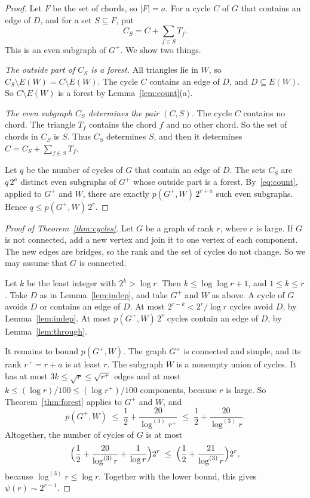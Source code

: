 \documentclass[11pt]{article}
\theoremstyle{definition}
\theoremstyle{remark}
\newcommand{\lgk}[1]{\log^{(#1)}}
\newcommand{\sm}{\setminus}
\numberwithin{equation}{section}
\begin{document}
\begin{proof}
Let $F$ be the set of chords, so $|F|=a$. For a cycle $C$ of $G$ that contains an edge of $D$, and
for a set $S\subseteq F$, put
\[
  C_S=C+\sum_{f\in S}T_f .
\]
This is an even subgraph of $G^{+}$. We show two things.

\emph{The outside part of $C_S$ is a forest.} All triangles lie in $W$, so
$C_S\sm E(W)=C\sm E(W)$. The cycle $C$ contains an edge of $D$, and $D\subseteq E(W)$. So
$C\sm E(W)$ is a forest by Lemma~\ref{lem:count}(a).

\emph{The even subgraph $C_S$ determines the pair $(C,S)$.} The cycle $C$ contains no chord. The
triangle $T_f$ contains the chord $f$ and no other chord. So the set of chords in $C_S$ is $S$. Thus
$C_S$ determines $S$, and then it determines $C=C_S+\sum_{f\in S}T_f$.

Let $q$ be the number of cycles of $G$ that contain an edge of $D$. The sets $C_S$ are $q\,2^{a}$
distinct even subgraphs of $G^{+}$ whose outside part is a forest. By~\eqref{eq:count}, applied to
$G^{+}$ and $W$, there are exactly $p(G^{+},W)\,2^{r+a}$ such even subgraphs. Hence
$q\le p(G^{+},W)\,2^{r}$.
\end{proof}

\begin{proof}[Proof of Theorem~\ref{thm:cycles}]
Let $G$ be a graph of rank $r$, where $r$ is large. If $G$ is not connected, add a new vertex and
join it to one vertex of each component. The new edges are bridges, so the rank and the set of
cycles do not change. So we may assume that $G$ is connected.

Let $k$ be the least integer with $2^{k}>\log r$. Then $k\le\log\log r+1$, and $1\le k\le r$. Take
$D$ as in Lemma~\ref{lem:indep}, and take $G^{+}$ and $W$ as above. A cycle of $G$ avoids $D$ or
contains an edge of $D$. At most $2^{r-k}<2^{r}/\log r$ cycles avoid $D$, by
Lemma~\ref{lem:indep}. At most $p(G^{+},W)\,2^{r}$ cycles contain an edge of $D$, by
Lemma~\ref{lem:through}.

It remains to bound $p(G^{+},W)$. The graph $G^{+}$ is connected and simple, and its rank
$r^{+}=r+a$ is at least $r$. The subgraph $W$ is a nonempty union of cycles. It has at most
$3k\le\sqrt{r}\le\sqrt{r^{+}}$ edges and at most $k\le(\log r)/100\le(\log r^{+})/100$ components,
because $r$ is large. So Theorem~\ref{thm:forest} applies to $G^{+}$ and $W$, and
\[
  p(G^{+},W)\;\le\;\frac12+\frac{20}{\lgk3r^{+}}\;\le\;\frac12+\frac{20}{\lgk3r}.
\]
Altogether, the number of cycles of $G$ is at most
\[
  \Bigl(\frac12+\frac{20}{\lgk3r}+\frac1{\log r}\Bigr)2^{r}
  \;\le\;\Bigl(\frac12+\frac{21}{\lgk3r}\Bigr)2^{r},
\]
because $\lgk3r\le\log r$. Together with the lower bound, this gives $\psi(r)\sim2^{r-1}$.
\end{proof}
\end{document}
